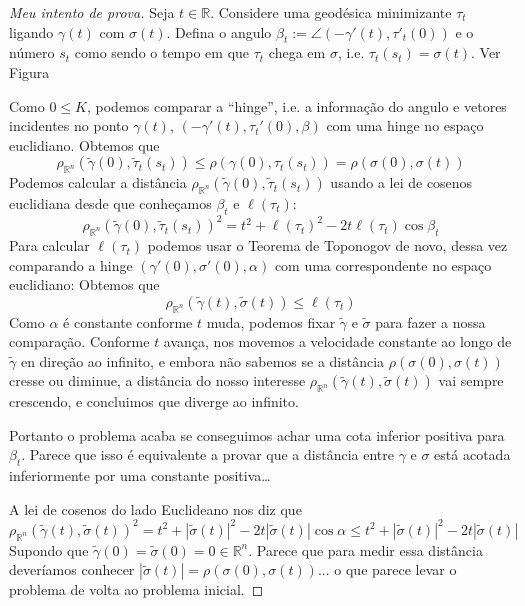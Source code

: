\begin{proof}[Meu intento de prova]
Seja $t \in \mathbb{R}$. Considere uma geodésica minimizante $\tau_t$ ligando
$\gamma(t)$ com $\sigma(t)$. Defina o angulo 
$\beta_t:=\angle(-\gamma'(t),\tau'_t(0))$ e o número $s_t$ como sendo o tempo em que
$\tau_t$ chega em $\sigma$, i.e. $\tau_t(s_t)=\sigma(t)$. Ver Figura

Como $0 \leq  K$, podemos comparar a ``hinge'',
i.e. a informação do angulo e vetores incidentes no ponto $\gamma(t)$, 
$(-\gamma'(t),\tau_t'(0),\beta)$ com uma hinge no espaço
euclidiano. Obtemos que 
$$
\rho_{\mathbb{R}^n}(\tilde{\gamma}(0),\tilde{\tau}_t(s_t))\leq
\rho(\gamma(0),\tau_t(s_t))=\rho(\sigma(0),\sigma(t))
$$
Podemos calcular a distância
$\rho_{\mathbb{R}^n}(\tilde{\gamma}(0),\tilde{\tau}_t(s_t))$ usando a lei de
cosenos euclidiana desde que conheçamos $\beta_t$ e $\ell(\tau_t)$:
$$
\rho_{\mathbb{R}^n}(\tilde{\gamma}(0),\tilde{\tau}_t(s_t))^2=
t^2+\ell(\tau_t)^2-2t\ell(\tau_t)\cos \beta_t
$$
Para calcular $\ell(\tau_t)$ podemos usar o Teorema de Toponogov de novo, dessa
vez comparando a hinge $(\gamma'(0), \sigma'(0),\alpha)$ com uma correspondente
no espaço euclidiano:
Obtemos que
$$
\rho_{\mathbb{R}^n}(\tilde{\gamma}(t),\tilde{\sigma}(t))\leq \ell(\tau_t)
$$
Como $\alpha$ é constante conforme $t$ muda, podemos fixar $\tilde{\gamma}$ e
$\tilde{\sigma}$ para fazer a nossa comparação. Conforme  $t$ avança, nos
movemos a velocidade constante ao longo de $\tilde{\gamma}$ en direção ao
infinito, e embora não sabemos se a distância $\rho(\sigma(0),\sigma(t))$ cresse
 ou diminue, a distância do nosso interesse 
$\rho_{\mathbb{R}^n}(\tilde{\gamma}(t),\tilde{\sigma}(t))$
vai sempre crescendo, e concluimos que diverge ao infinito.

Portanto o problema acaba se conseguimos achar uma cota inferior positiva para
$\beta_t$. Parece que isso é equivalente a provar que a distância entre
$\gamma$ e $\sigma$ está acotada inferiormente por uma constante positiva…

A lei de cosenos do lado Euclideano nos diz que
$$
\rho_{\mathbb{R}^n}(\tilde{\gamma}(t),\tilde{\sigma}(t))^2=
t^2+|\tilde{\sigma}(t)|^2-2t |\tilde{\sigma}(t)|\cos \alpha
\leq t^2+|\tilde{\sigma}(t)|^2-2t |\tilde{\sigma}(t)|
$$
Supondo que $\tilde{\gamma}(0)=\tilde{\sigma}(0)=0 \in \mathbb{R}^n$. 
Parece que para medir essa distância deveríamos conhecer
$|\tilde{\sigma}(t)|=\rho(\sigma(0),\sigma(t))$...
 o que parece levar o problema de volta ao
problema inicial.
\end{proof}

